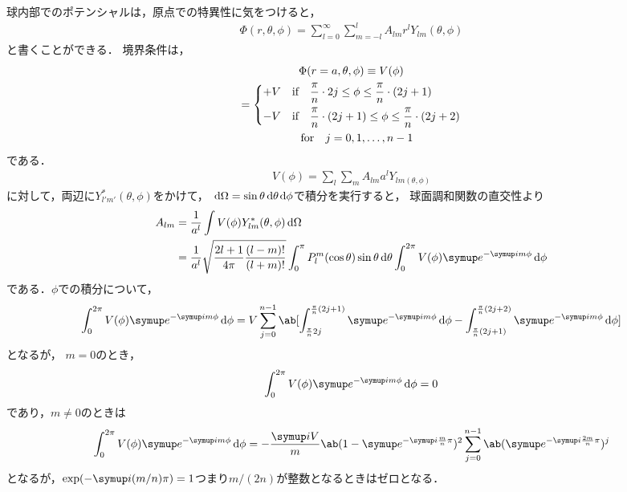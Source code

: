   球内部でのポテンシャルは，原点での特異性に気をつけると，
  \begin{gather}%
    \label{eq:3-4_eq1}
    \Phi(r,\theta,\phi) = \sum_{l=0}^\infty \sum_{m=-l}^{l} A_{lm}r^l Y_{lm}(\theta,\phi)
  \end{gather}%
  と書くことができる．
  境界条件は，
  \begin{multline}%
    \Phi(r=a,\theta,\phi) \equiv V(\phi)\\=
    \begin{dcases}%
      +V \qqtext{if} \frac{\pi}{n} \cdot 2j \leq \phi \leq \frac{\pi}{n}\cdot(2j+1)\\
      -V \qqtext{if} \frac{\pi}{n}\cdot(2j+1) \leq \phi \leq \frac{\pi}{n}\cdot (2j+2)
    \end{dcases}\\%
    \qqtext{for} j = 0, 1, \ldots, n-1
  \end{multline}%
  である．
  \begin{gather}%
    V(\phi) = \sum_{l} \sum_{m} A_{lm} a^l Y_{lm{(\theta,\phi)}}
  \end{gather}%
  に対して，両辺に$Y^*_{l'm'}(\theta,\phi)$をかけて，
  $\dl{\Omega} = \sin\theta\dl{\theta,\phi}$で積分を実行すると，
  球面調和関数の直交性より
  \begin{align}%
    A_{lm} &= \frac{1}{a^l} \int V(\phi) Y^*_{lm}(\theta,\phi) \dl{\Omega}\notag\\
    &= \frac{1}{a^l} \sqrt{\frac{2l+1}{4\pi}\frac{(l-m)!}{(l+m)!}}\int_0^\pi
    P_{l}^m(\cos\theta)\sin\theta\dl{\theta} \int_0^{2\pi} V(\phi) \e^{-\i m\phi}\dl{\phi}
  \end{align}%
  である．$\phi$での積分について，
  \begin{multline}
    \int_0^{2\pi} V(\phi) \e^{-\i m\phi} \dl{\phi} = V \sum_{j=0}^{n-1} \ab[
      \int_{\frac{\pi}{n}2j}^{\frac{\pi}{n}(2j+1)} \e^{-\i m\phi}\dl{\phi}
       - \int_{\frac{\pi}{n}(2j+1)}^{\frac{\pi}{n}(2j+2)} \e^{-\i m\phi}\dl{\phi}
    ]
  \end{multline}
  となるが， $m = 0$のとき，
  \begin{gather}%
    \int_0^{2\pi} V(\phi)\e^{-\i m\phi} \dl{\phi} =  0
  \end{gather}%
  であり，$m \neq 0$のときは
  \begin{gather}%
    \int_0^{2\pi} V(\phi) \e^{-\i m\phi} \dl{\phi} =
      - \frac{\i V}{m} \ab(1-\e^{-\i \frac{m}{n}\pi})^2 \sum_{j=0}^{n-1}\ab(\e^{-\i \frac{2m}{n}\pi})^j
  \end{gather}%
  となるが，$\exp(-\i (m/n)\pi) = 1$つまり$m/(2n)$が整数となるときはゼロとなる．
